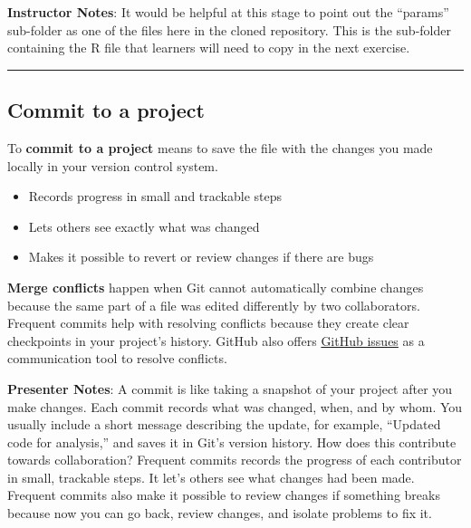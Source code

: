 \documentclass[
  letterpaper,
  DIV=11,
  numbers=noendperiod]{scrartcl}
\providecommand{\tightlist}{%
  \setlength{\itemsep}{0pt}\setlength{\parskip}{0pt}}
\begin{document}
\textbf{Instructor Notes}: It would be helpful at this stage to point
out the ``params'' sub-folder as one of the files here in the cloned
repository. This is the sub-folder containing the R file that learners
will need to copy in the next exercise.

\begin{center}\rule{0.5\linewidth}{0.5pt}\end{center}

\subsection{Commit to a project}\label{commit-to-a-project}

To \textbf{commit to a project} means to save the file with the changes
you made locally in your version control system.

\begin{itemize}
\tightlist
\item
  Records progress in small and trackable steps
\item
  Lets others see exactly what was changed
\item
  Makes it possible to revert or review changes if there are bugs
\end{itemize}

\begin{tcolorbox}[enhanced jigsaw, arc=.35mm, bottomrule=.15mm, bottomtitle=1mm, breakable, colback=white, colbacktitle=quarto-callout-tip-color!10!white, colframe=quarto-callout-tip-color-frame, coltitle=black, left=2mm, leftrule=.75mm, opacityback=0, opacitybacktitle=0.6, rightrule=.15mm, title=\textcolor{quarto-callout-tip-color}{\faLightbulb}\hspace{0.5em}{Avoiding merge conflicts}, titlerule=0mm, toprule=.15mm, toptitle=1mm]

\textbf{Merge conflicts} happen when Git cannot automatically combine
changes because the same part of a file was edited differently by two
collaborators. Frequent commits help with resolving conflicts because
they create clear checkpoints in your project's history. GitHub also
offers
\href{https://docs.github.com/en/issues/tracking-your-work-with-issues/learning-about-issues/about-issues}{GitHub
issues} as a communication tool to resolve conflicts.

\end{tcolorbox}

\textbf{Presenter Notes}: A commit is like taking a snapshot of your
project after you make changes. Each commit records what was changed,
when, and by whom. You usually include a short message describing the
update, for example, ``Updated code for analysis,'' and saves it in
Git's version history. How does this contribute towards collaboration?
Frequent commits records the progress of each contributor in small,
trackable steps. It let's others see what changes had been made.
Frequent commits also make it possible to review changes if something
breaks because now you can go back, review changes, and isolate problems
to fix it.
\end{document}
